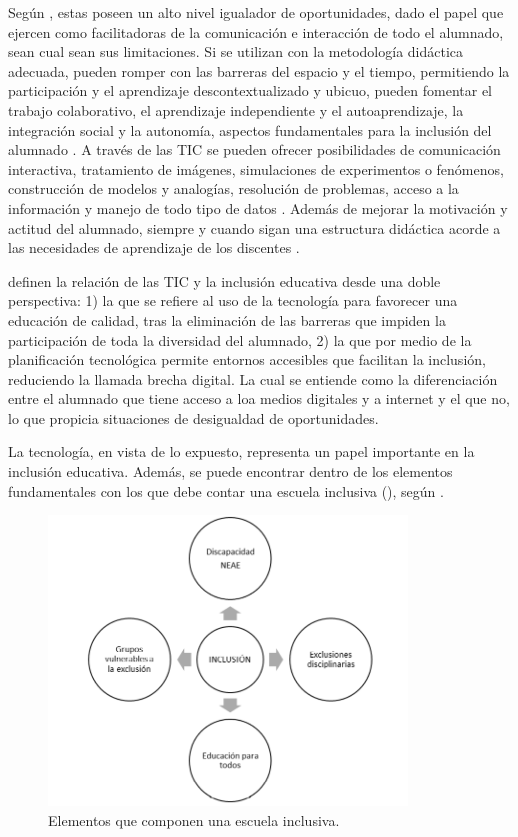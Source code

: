 \documentclass{textolivre}
\begin{document}
Según \textcite{fernandezbatanero2019}, estas poseen un alto nivel igualador de oportunidades, dado el papel que ejercen como facilitadoras de la comunicación e interacción de todo el alumnado, sean cual sean sus limitaciones. Si se utilizan con la metodología didáctica adecuada, pueden romper con las barreras del espacio y el tiempo, permitiendo la participación y el aprendizaje descontextualizado y ubicuo, pueden fomentar el trabajo colaborativo, el aprendizaje independiente y el autoaprendizaje, la integración social y la autonomía, aspectos fundamentales para la inclusión del alumnado \cite{cascales-martinez2018}. A través de las TIC se pueden ofrecer posibilidades de comunicación interactiva, tratamiento de imágenes, simulaciones de experimentos o fenómenos, construcción de modelos y analogías, resolución de problemas, acceso a la información y manejo de todo tipo de datos \cite{cadenagonzalez2019}. Además de mejorar la motivación y actitud del alumnado, siempre y cuando sigan una estructura didáctica acorde a las necesidades de aprendizaje de los discentes \cite{morenoguerrero2018}.  

\textcite{caberoalmenara2017} definen la relación de las TIC y la inclusión educativa desde una doble perspectiva: 1) la que se refiere al uso de la tecnología para favorecer una educación de calidad, tras la eliminación de las barreras que impiden la participación de toda la diversidad del alumnado, 2) la que por medio de la planificación tecnológica permite entornos accesibles que facilitan la inclusión, reduciendo la llamada brecha digital. La cual se entiende como la diferenciación entre el alumnado que tiene acceso a loa medios digitales y a internet y el que no, lo que propicia situaciones de desigualdad de oportunidades.

La tecnología, en vista de lo expuesto, representa un papel importante en la inclusión educativa. Además, se puede encontrar dentro de los elementos fundamentales con los que debe contar una escuela inclusiva (), según \textcite{caberoalmenara2017}.

\begin{figure}[htbp]
 \centering
 \includegraphics[width=0.85\textwidth]{imagem2.png}
 \caption{Elementos que componen una escuela inclusiva.}
 \label{fig2}
\end{figure}
\end{document}

